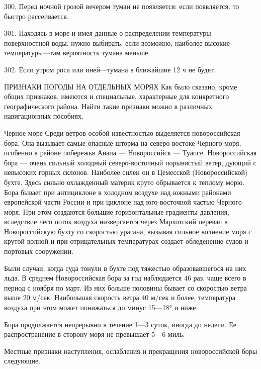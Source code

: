 300. Перед ночной грозой вечером туман не появляется: если появляется, то быстро рассеивается.

301. Находясь в море и имея данные о распределении температуры поверхностной воды, нужно выбирать, если возможно, наиболее высокие температуры—там вероятность тумана меньше.

302. Если утром роса или иней—тумана в ближайшие 12 ч не будет.

ПРИЗНАКИ ПОГОДЫ НА ОТДЕЛЬНЫХ МОРЯХ
Как было сказано, кроме общих признаков, имеются и специальные, характерные для конкретного географического района. Найти такие признаки можно в различных навигационных пособиях.

Черное море
Среди ветров особой известностью выделяется новороссийская бора. Она вызывает самые опасные шторма на северо-востоке Черного моря, особенно в районе побережья Анапа — Новороссийск — Туапсе. Новороссийская бора — очень сильный холодный северо-восточный порывистый ветер, дующий с невысоких горных склонов. Наиболее силен он в Цемесской (Новороссийской) бухте. Здесь сильно охлажденный материк круто обрывается к теплому морю.
Бора бывает при антициклоне в холодном воздухе над южными районами европейской части России и при циклоне над юго-восточной частью Черного моря. При этом создаются большие горизонтальные градиенты давления, вследствие чего поток воздуха низвергается через Мархотский перевал в Новороссийскую бухту со скоростью урагана, вызывая сильное волнение моря с крутой волной и при отрицательных температурах создает обледенение судов и портовых сооружении.

Были случаи, когда суда тонули в бухте под тяжестью образовавшегося на них льда. В среднем Новороссийская бора за год наблюдается 46 раз, чаще всего в период с ноября по март. Из них больше половины бывает со скоростью ветра выше 20 м/сек. Наибольшая скорость ветра 40 м/сек и более, температура воздуха при этом может понижаться до минус 15—18° и ниже.

Бора продолжается непрерывно в течение 1—3 суток, иногда до недели. Ее распространение в сторону моря не превышает 5—6 миль.

Местные признаки наступления, ослабления и прекращения новороссийской боры следующие.

